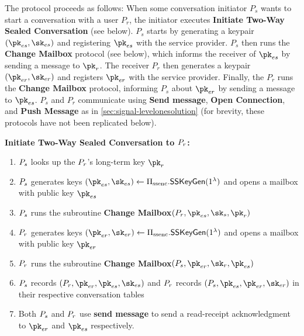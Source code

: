 The protocol proceeds as follows: When some conversation initiator $P_s$ wants to start a conversation with a user $P_r$, the initiator executes \textbf{Initiate Two-Way Sealed Conversation} (see below). $P_s$ starts by generating a keypair $(\pk_{es}, \sk_{es})$ and registering $\pk_{es}$ with the service provider.  $P_s$ then runs the {\bf Change Mailbox} protocol (see below), which informs the receiver of $\pk_{es}$ by sending a message to $\pk_r$.  The receiver $P_r$ then generates a keypair $(\pk_{er}, \sk_{er})$ and registers $\pk_{er}$ with the service provider.  Finally, the $P_r$ runs the {\bf Change Mailbox} protocol, informing $P_s$ about $\pk_{er}$ by sending a message to $\pk_{es}$.  $P_s$ and $P_r$ communicate using {\bf Send message}, {\bf Open Connection}, and {\bf Push Message} as in \cref{sec:signal-levelonesolution} (for brevity, these protocols have not been replicated below).


\smallskip \noindent
\textbf{Initiate Two-Way Sealed Conversation to $P_r$:}
\begin{enumerate}[noitemsep]
  \item $P_s$ looks up the $P_r$'s long-term key $\pk_r$
  \item $P_s$ generates keys $(\pk_{es}, \sk_{es}) \leftarrow \sealedsenderencryptionscheme.\sealedsenderencryptiongen(1^\securityparameter)$ and opens a mailbox with public key $\pk_{es}$%
  \item $P_s$ runs the subroutine {\bf Change Mailbox}$(P_r, \pk_{es}, \sk_s, \pk_r)$
  \item $P_r$ generates keys $(\pk_{er}, \sk_{er}) \leftarrow \sealedsenderencryptionscheme.\sealedsenderencryptiongen(1^\securityparameter)$ and opens a mailbox with public key $\pk_{er}$
  \item $P_r$ runs the subroutine {\bf Change Mailbox}$(P_s, \pk_{er}, \sk_r, \pk_{es})$
  \item $P_s$ records $(\receiverr, \pk_{er}, \pk_{es}, \sk_{es})$ and $P_r$ records $(\senders, \pk_{es}, \pk_{er}, \sk_{er})$ in their respective conversation tables
  \item Both $P_s$ and $P_r$ use {\bf send message} to send a read-receipt acknowledgment to $\pk_{er}$ and $\pk_{es}$ respectively. 
\end{enumerate}


